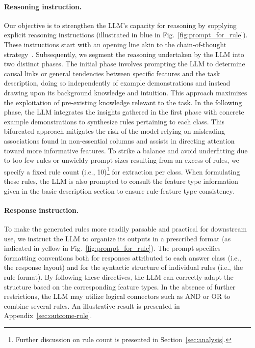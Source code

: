 \paragraph{Reasoning instruction.} Our objective is to strengthen the LLM's capacity for reasoning by supplying explicit reasoning instructions (illustrated in blue in Fig.~\ref{fig:prompt_for_rule}). These instructions start with an opening line akin to the chain-of-thought strategy~\cite{wei2022chain}. Subsequently, we segment the reasoning undertaken by the LLM into two distinct phases. The initial phase involves prompting the LLM to determine causal links or general tendencies between specific features and the task description, doing so independently of example demonstrations and instead drawing upon its background knowledge and intuition. This approach maximizes the exploitation of pre-existing knowledge relevant to the task. In the following phase, the LLM integrates the insights gathered in the first phase with concrete example demonstrations to synthesize rules pertaining to each class. This bifurcated approach mitigates the risk of the model relying on misleading associations found in non-essential columns and assists in directing attention toward more informative features. To strike a balance and avoid underfitting due to too few rules or unwieldy prompt sizes resulting from an excess of rules, we specify a fixed rule count (i.e., 10)\footnote{Further discussion on rule count is presented in Section~\ref{sec:analysis}.} for extraction per class. When formulating these rules, the LLM is also prompted to consult the feature type information given in the basic description section to ensure rule-feature type consistency.

\vspace*{-0.12in}
\paragraph{Response instruction.} To make the generated rules more readily parsable and practical for downstream use, we instruct the LLM to organize its outputs in a prescribed format (as indicated in yellow in Fig.~\ref{fig:prompt_for_rule}). The prompt specifies formatting conventions both for responses attributed to each answer class (i.e., the response layout) and for the syntactic structure of individual rules (i.e., the rule format). By following these directives, the LLM can correctly adapt the structure based on the corresponding feature types. In the absence of further restrictions, the LLM may utilize logical connectors such as AND or OR to combine several rules. An illustrative result is presented in Appendix~\ref{sec:outcome-rule}.

